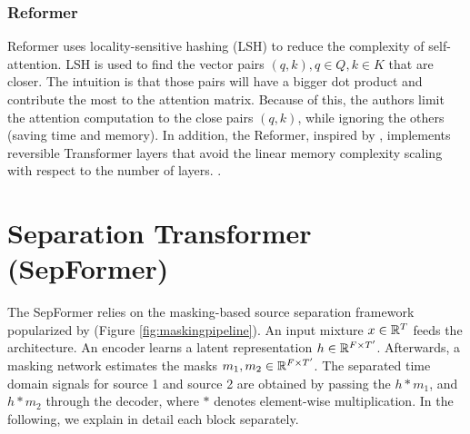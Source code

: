 \documentclass[lettersize,journal]{IEEEtran}
\begin{document}
\subsubsection{Reformer}
Reformer \cite{kitaev2020reformer} uses locality-sensitive hashing (LSH) to reduce the complexity of self-attention. LSH is used to find the vector pairs $(q,k), q \in Q, k \in K$ that are closer. The intuition is that those pairs will have a bigger dot product and contribute the most to the attention matrix. Because of this, the authors limit the attention computation to the close pairs $(q,k)$, while ignoring the others (saving time and memory). In addition, the Reformer, inspired by \cite{DBLP:journals/corr/GomezRUG17}, implements reversible Transformer layers that avoid the linear memory complexity scaling with respect to the number of layers. .


\section{Separation Transformer (SepFormer)}
\label{sec:sepformer}



The SepFormer relies on the masking-based source separation framework popularized by \cite{luo2017tasnet, luo2018convtasnet} (Figure \ref{fig:maskingpipeline}). An input mixture $x \in \mathbb R^{T}$ feeds the architecture. An encoder learns a latent representation $h \in \mathbb R^{F \times T'}$. Afterwards, a masking network estimates the masks $m_1, m_2 \in \mathbb R^{F \times T'}$. The separated time domain signals for source 1 and source 2 are obtained by passing the $h*m_1$, and $h*m_2$ through the decoder, where $*$ denotes element-wise multiplication. In the following, we explain in detail each block separately. 
\end{document}
